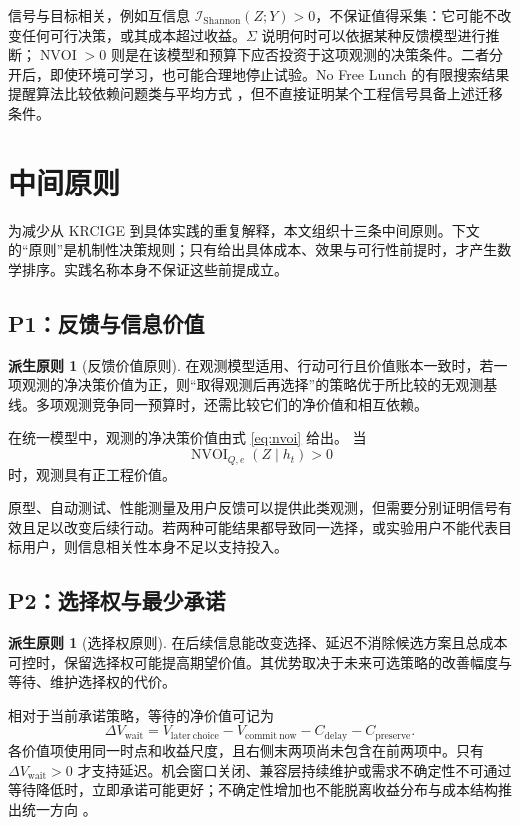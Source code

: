 \documentclass[11pt,a4paper]{ctexart}
\numberwithin{equation}{section}
\theoremstyle{definition}
\newtheorem{principle}[definition]{派生原则}
\theoremstyle{plain}
\begin{document}
信号与目标相关，例如互信息 $\mathcal I_{\mathrm{Shannon}}(Z;Y)>0$，不保证值得采集：它可能不改变任何可行决策，或其成本超过收益。$\Sigma$ 说明何时可以依据某种反馈模型进行推断；$\operatorname{NVOI}>0$ 则是在该模型和预算下应否投资于这项观测的决策条件。二者分开后，即使环境可学习，也可能合理地停止试验。No Free Lunch 的有限搜索结果提醒算法比较依赖问题类与平均方式 \cite{wolpert1997}，但不直接证明某个工程信号具备上述迁移条件。

\section{中间原则}

为减少从 KRCIGE 到具体实践的重复解释，本文组织十三条中间原则。下文的“原则”是机制性决策规则；只有给出具体成本、效果与可行性前提时，才产生数学排序。实践名称本身不保证这些前提成立。

\subsection{P1：反馈与信息价值}

\begin{principle}[反馈价值原则]
在观测模型适用、行动可行且价值账本一致时，若一项观测的净决策价值为正，则“取得观测后再选择”的策略优于所比较的无观测基线。多项观测竞争同一预算时，还需比较它们的净价值和相互依赖。
\end{principle}

在统一模型中，观测的净决策价值由式 \eqref{eq:nvoi} 给出。
当
\[
\operatorname{NVOI}_{Q,e}(Z\mid h_t)>0
\]
时，观测具有正工程价值。

原型、自动测试、性能测量及用户反馈可以提供此类观测，但需要分别证明信号有效且足以改变后续行动。若两种可能结果都导致同一选择，或实验用户不能代表目标用户，则信息相关性本身不足以支持投入。

\subsection{P2：选择权与最少承诺}

\begin{principle}[选择权原则]
在后续信息能改变选择、延迟不消除候选方案且总成本可控时，保留选择权可能提高期望价值。其优势取决于未来可选策略的改善幅度与等待、维护选择权的代价。
\end{principle}

相对于当前承诺策略，等待的净价值可记为
\[
\Delta V_{\mathrm{wait}}
=V_{\mathrm{later\ choice}}-V_{\mathrm{commit\ now}}
-C_{\mathrm{delay}}-C_{\mathrm{preserve}}.
\]
各价值项使用同一时点和收益尺度，且右侧末两项尚未包含在前两项中。只有 $\Delta V_{\mathrm{wait}}>0$ 才支持延迟。机会窗口关闭、兼容层持续维护或需求不确定性不可通过等待降低时，立即承诺可能更好；不确定性增加也不能脱离收益分布与成本结构推出统一方向 \cite{sullivan1999}。
\end{document}
